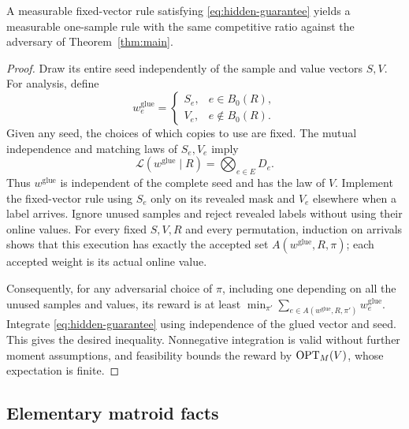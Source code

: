 \begin{lemma}\label{lem:simulation}
A measurable fixed-vector rule satisfying \eqref{eq:hidden-guarantee} yields
a measurable one-sample rule with the same competitive ratio against the
adversary of Theorem~\ref{thm:main}.
\end{lemma}
\begin{proof}
Draw its entire seed independently of the sample and value vectors $S,V$.
For analysis, define
\[
 w_e^{\mathrm{glue}}=
 \begin{cases}S_e,&e\in B_0(R),\\ V_e,&e\notin B_0(R).\end{cases}
\]
Given any seed, the choices of which copies to use are fixed. The mutual
independence and matching laws of $S_e,V_e$ imply
\[
 \mathcal L(w^{\mathrm{glue}}\mid R)
       =\bigotimes_{e\in E}D_e.
\]
Thus $w^{\mathrm{glue}}$ is independent of the complete seed and has the
law of $V$. Implement the fixed-vector rule using $S_e$ only on its revealed
mask and $V_e$ elsewhere when a label arrives. Ignore unused samples and
reject revealed labels without using their online values. For every fixed
$S,V,R$ and every permutation, induction on arrivals shows that this
execution has exactly the accepted set $A(w^{\mathrm{glue}},R,\pi)$;
each accepted weight is its actual online value.

Consequently, for any adversarial choice of $\pi$, including one depending
on all the unused samples and values, its reward is at least
$\min_{\pi'}\sum_{e\in A(w^{\mathrm{glue}},R,\pi')}w_e^{\mathrm{glue}}$.
Integrate \eqref{eq:hidden-guarantee} using independence of the glued vector
and seed. This gives the desired inequality. Nonnegative integration is
valid without further moment assumptions, and feasibility bounds the
reward by $\operatorname{OPT}_M(V)$, whose expectation is finite.
\end{proof}

\subsection{Elementary matroid facts}

